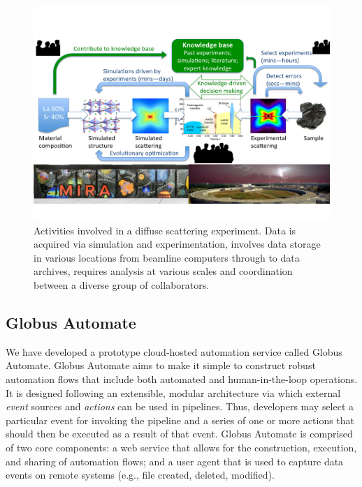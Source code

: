 \documentclass{aip-cp}
\newcommand\kyle[1]{}
\newcommand\kyle[1]{{\color{purple}[Kyle: #1]}}
\begin{document}
\begin{figure}[h]
  \centerline{\includegraphics[width=6in,trim=0 2.6in 0 1.5in,clip]{Figs/diffuse.png}}
  \caption{Activities involved in a diffuse scattering experiment. Data is acquired
   via simulation and experimentation, involves data storage in various locations
from beamline computers through to data archives, requires analysis at various scales
and coordination between a diverse group of collaborators. 
\label{fig:diffuse}}
\end{figure}

\subsection{Globus Automate}

\kyle{I'm not sure on page limits so I tried to keep this brief. We can go deeper
into the event and action interfaces if needed.}

We have developed a prototype cloud-hosted automation service called Globus Automate. 
Globus Automate aims to make it simple to construct robust automation flows
that include both automated and human-in-the-loop operations. 
It is designed following an extensible, modular architecture via which external
\emph{event} sources and \emph{actions} can be used in pipelines. 
Thus, developers may select a particular event for invoking the pipeline
and a series of one or more actions that should then be executed as 
a result of that event.
Globus Automate is comprised of two core components: a web service
that allows for the construction, execution, and sharing of automation
flows; and a user agent that is used to capture data events on remote systems
(e.g., file created, deleted, modified). 
\end{document}
